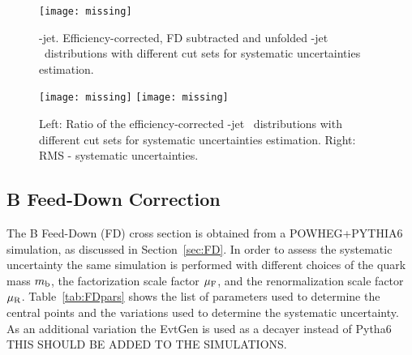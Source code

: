 \begin{figure}[bth]
\begin{center}
\texttt{[image: missing]}
\caption{\Dzero-jet. Efficiency-corrected, FD subtracted and unfolded \Dzero-jet \pt\ distributions with different cut sets for systematic uncertainties estimation.} 
\label{fig:JetPtSys_Dzero}
\end{center}
\end{figure}

\begin{figure}[bth]
\begin{center}
\texttt{[image: missing]}
\texttt{[image: missing]}
\caption{Left: Ratio of the efficiency-corrected \Dstar-jet \pt\ distributions with different cut sets for systematic uncertainties estimation. Right: RMS - systematic uncertainties.} 
\label{fig:JetPtSys_Dzero}
\end{center}
\end{figure}

%

\subsection{B Feed-Down Correction}

The B Feed-Down (FD) cross section is obtained from a POWHEG+PYTHIA6 simulation, as discussed in Section~\ref{sec:FD}.
In order to assess the systematic uncertainty the same simulation is performed with different choices of the quark mass $m_{\rm b}$, the factorization scale factor $\mu_{\rm F}$, and the renormalization scale factor $\mu_{\rm R}$.
Table~\ref{tab:FDpars} shows the list of parameters used to determine the central points and the variations used to determine the systematic uncertainty.
As an additional variation the EvtGen is used as a decayer instead of Pytha6 {\color{red} THIS SHOULD BE ADDED TO THE SIMULATIONS}. 

